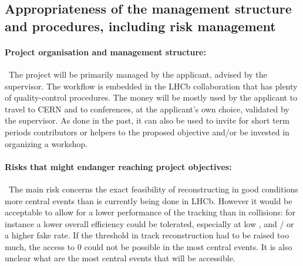 \documentclass[a4paper,11pt]{article}
\begin{document}

\lipsum[1] %

%            

\subsection{Appropriateness of the management structure and procedures, including risk management }


\paragraph{Project organisation and management structure: }\
The project will be primarily managed by the applicant, advised by the supervisor. The workflow is embedded in the LHCb
collaboration that has plenty of quality-control procedures. The money will be mostly used by the applicant to travel to
CERN and to conferences, at the applicant’s own choice, validated by the supervisor. As done in the past,
it can also be used to invite for short term periods contributors or helpers to the proposed objective and/or
be invested in organizing a workshop.



\paragraph{Risks that might endanger reaching project objectives: }\
The main risk concerns the exact feasibility of reconstructing in good conditions more central events than is currently being done in LHCb. However it would be acceptable to allow for a lower performance of the tracking than in \pp collisions: for instance a lower overall efficiency could be tolerated, especially at low \pt, and / or a higher fake rate. If the \pt threshold in track reconstruction had to be raised too much, the access to 0 \pt \Dz could not be possible in the most central events. It is also unclear what are the most central events that will be accessible. 
\end{document}
